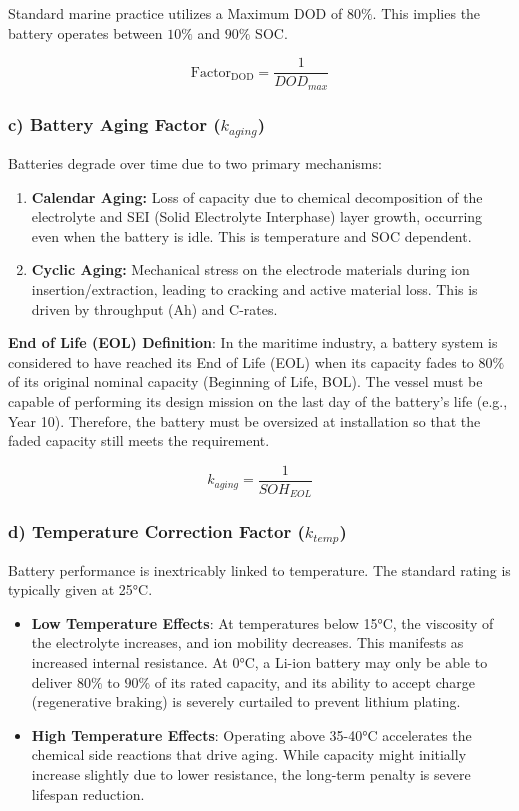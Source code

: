 Standard marine practice utilizes a Maximum DOD of $80\%$. This implies the battery operates between $10\%$ and $90\%$ SOC.

\begin{equation}
\text{Factor}_{\text{DOD}} = \frac{1}{DOD_{max}} 
\end{equation}

\subsubsection{c) Battery Aging Factor ($k_{aging}$)}

Batteries degrade over time due to two primary mechanisms:

\begin{enumerate}
	\item \textbf{Calendar Aging:} Loss of capacity due to chemical decomposition of the electrolyte and SEI (Solid Electrolyte Interphase) layer growth, occurring even when the battery is idle. This is temperature and SOC dependent.
	\item \textbf{Cyclic Aging:} Mechanical stress on the electrode materials during ion insertion/extraction, leading to cracking and active material loss. This is driven by throughput (Ah) and C-rates.
\end{enumerate}

\textbf{End of Life (EOL) Definition}: In the maritime industry, a battery system is considered to have reached its End of Life (EOL) when its capacity fades to $80\%$ of its original nominal capacity (Beginning of Life, BOL). The vessel must be capable of performing its design mission on the last day of the battery's life (e.g., Year 10). Therefore, the battery must be oversized at installation so that the faded capacity still meets the requirement.



\begin{equation}
k_{aging} = \frac{1}{SOH_{EOL}}
\end{equation}


\subsubsection{d) Temperature Correction Factor ($k_{temp}$)}

Battery performance is inextricably linked to temperature. The standard rating is typically given at 25°C.

\begin{itemize}
	\item \textbf{Low Temperature Effects}: At temperatures below 15°C, the viscosity of the electrolyte increases, and ion mobility decreases. This manifests as increased internal resistance. At 0°C, a Li-ion battery may only be able to deliver $80\%$ to $90\%$ of its rated capacity, and its ability to accept charge (regenerative braking) is severely curtailed to prevent lithium plating.
	\item \textbf{High Temperature Effects}: Operating above 35-40°C accelerates the chemical side reactions that drive aging. While capacity might initially increase slightly due to lower resistance, the long-term penalty is severe lifespan reduction.
\end{itemize}

